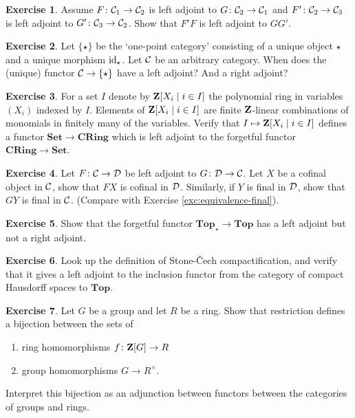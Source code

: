 \documentclass[11pt]{amsbook}
\def\id{{\rm id}}
\def\Set{\mathbf{Set}}
\def\Top{\mathbf{Top}}
\def\CRing{\mathbf{CRing}}
\theoremstyle{plain}
\theoremstyle{definition}
\newtheorem{exercise}{Exercise}
\begin{document}
\begin{exercise}
Assume $F\colon {\mathcal{C}}_1\to {\mathcal{C}}_2$ is left adjoint to $G\colon {\mathcal{C}}_2\to {\mathcal{C}}_1$ and $F'\colon {\mathcal{C}}_2\to {\mathcal{C}}_3$ is left adjoint to $G'\colon {\mathcal{C}}_3\to{\mathcal{C}}_2$. Show that $F'F$ is left adjoint to $GG'$. 
\end{exercise}

\begin{exercise}
Let $\{\star\}$ be the `one-point category' consisting of a unique object $\star$ and a unique morphism $\id_\star$. Let ${\mathcal{C}}$ be an arbitrary category. When does the (unique) functor ${\mathcal{C}} \to \{\star\}$ have a left adjoint? And a right adjoint?
\end{exercise}


\begin{exercise}
For a set $I$ denote by ${\mathbf{Z}}[X_i \mid i\in I]$ the polynomial ring in variables $(X_i)$ indexed by $I$. Elements of ${\mathbf{Z}}[X_i \mid i\in I]$ are finite ${\mathbf{Z}}$-linear combinations of monomials in finitely many of the variables. Verify that $I\mapsto {\mathbf{Z}}[X_i \mid i\in I]$ defines a functor $\Set \to \CRing$ which is left adjoint to the forgetful functor $\CRing \to \Set$.
\end{exercise}


\begin{exercise} 
Let $F\colon {\mathcal{C}} \to {\mathcal{D}}$ be left adjoint to $G\colon {\mathcal{D}} \to {\mathcal{C}}$. Let $X$ be a cofinal object in ${\mathcal{C}}$, show that $FX$ is cofinal in ${\mathcal{D}}$. Similarly, if $Y$ is final in ${\mathcal{D}}$, show that $GY$ is final in ${\mathcal{C}}$. (Compare with Exercise \ref{exc:equivalence-final}).
\end{exercise}

\begin{exercise}\label{exc:forget-base-point}
Show that the forgetful functor $\Top_\star \to \Top$ has a left adjoint but not a right adjoint.
\end{exercise}


\begin{exercise}
Look up the definition of Stone-\v{C}ech compactification, and verify that it gives a left adjoint to the inclusion functor from the category of compact Hausdorff spaces to $\Top$. 
\end{exercise}

\begin{exercise}
Let $G$ be a group and let $R$ be a  ring. Show that restriction defines a bijection between the sets of
\begin{enumerate}
\item ring homomorphisms $f\colon {\mathbf{Z}}[G] \to R$ 
\item group homomorphisms $G \to R^\times$.
\end{enumerate}
Interpret this bijection as an adjunction between functors between the categories of groups and rings.
\end{exercise}
\end{document}
